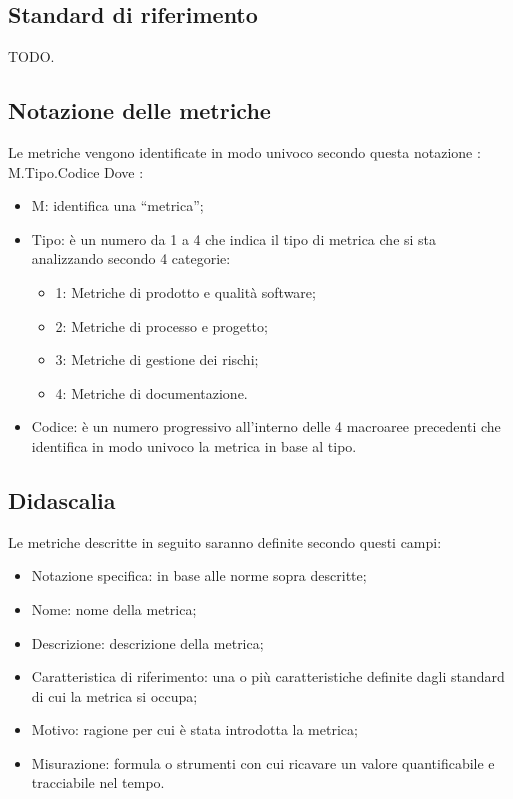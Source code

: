 \subsection{Standard di riferimento}

TODO.

\subsection{Notazione delle metriche}
Le metriche vengono identificate in modo univoco secondo questa notazione : M.Tipo.Codice
Dove : 
\begin{itemize}
    \item M: identifica una “metrica”;
    \item Tipo: è un numero da 1 a 4 che indica il tipo di metrica che si sta analizzando secondo 4 categorie: 
        \begin{itemize}
            \item 1: Metriche di prodotto e qualità software; 
            \item 2: Metriche di processo e progetto;
            \item 3: Metriche di gestione dei rischi;
            \item 4: Metriche di documentazione.
        \end{itemize}
    \item Codice: è un numero progressivo all’interno delle 4 macroaree precedenti che identifica in modo univoco la metrica in base al tipo.
\end{itemize}



\subsection{Didascalia}
Le metriche descritte in seguito saranno definite secondo questi campi: 
\begin{itemize}
    \item Notazione specifica: in base alle norme sopra descritte;
    \item Nome: nome della metrica;
    \item Descrizione: descrizione della metrica;
    \item Caratteristica di riferimento: una o più caratteristiche definite dagli standard di cui la metrica si occupa;
    \item Motivo: ragione per cui è stata introdotta la metrica;
    \item Misurazione: formula o strumenti con cui ricavare un valore quantificabile e tracciabile nel tempo.
\end{itemize}


